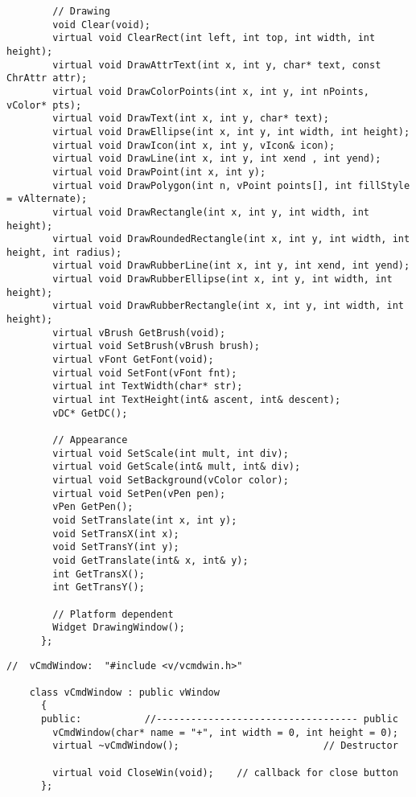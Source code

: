 \begin{verbatim}
        // Drawing
        void Clear(void);
        virtual void ClearRect(int left, int top, int width, int height);
        virtual void DrawAttrText(int x, int y, char* text, const ChrAttr attr);
        virtual void DrawColorPoints(int x, int y, int nPoints, vColor* pts);
        virtual void DrawText(int x, int y, char* text);
        virtual void DrawEllipse(int x, int y, int width, int height);
        virtual void DrawIcon(int x, int y, vIcon& icon);
        virtual void DrawLine(int x, int y, int xend , int yend);
        virtual void DrawPoint(int x, int y);
        virtual void DrawPolygon(int n, vPoint points[], int fillStyle = vAlternate);
        virtual void DrawRectangle(int x, int y, int width, int height);
        virtual void DrawRoundedRectangle(int x, int y, int width, int height, int radius);
        virtual void DrawRubberLine(int x, int y, int xend, int yend);
        virtual void DrawRubberEllipse(int x, int y, int width, int height);
        virtual void DrawRubberRectangle(int x, int y, int width, int height);
        virtual vBrush GetBrush(void);
        virtual void SetBrush(vBrush brush);
        virtual vFont GetFont(void);
        virtual void SetFont(vFont fnt);
        virtual int TextWidth(char* str);
        virtual int TextHeight(int& ascent, int& descent);
        vDC* GetDC();

        // Appearance
        virtual void SetScale(int mult, int div);
        virtual void GetScale(int& mult, int& div);
        virtual void SetBackground(vColor color);
        virtual void SetPen(vPen pen);
        vPen GetPen();
        void SetTranslate(int x, int y);
        void SetTransX(int x);
        void SetTransY(int y);
        void GetTranslate(int& x, int& y);
        int GetTransX();
        int GetTransY();

        // Platform dependent
        Widget DrawingWindow();
      };
\end{verbatim}
\normalfont\normalsize


\footnotesize
\begin{verbatim}
//  vCmdWindow:  "#include <v/vcmdwin.h>"

    class vCmdWindow : public vWindow
      {
      public:           //----------------------------------- public
        vCmdWindow(char* name = "+", int width = 0, int height = 0);
        virtual ~vCmdWindow();                         // Destructor

        virtual void CloseWin(void);    // callback for close button
      };
\end{verbatim}
\normalfont\normalsize

